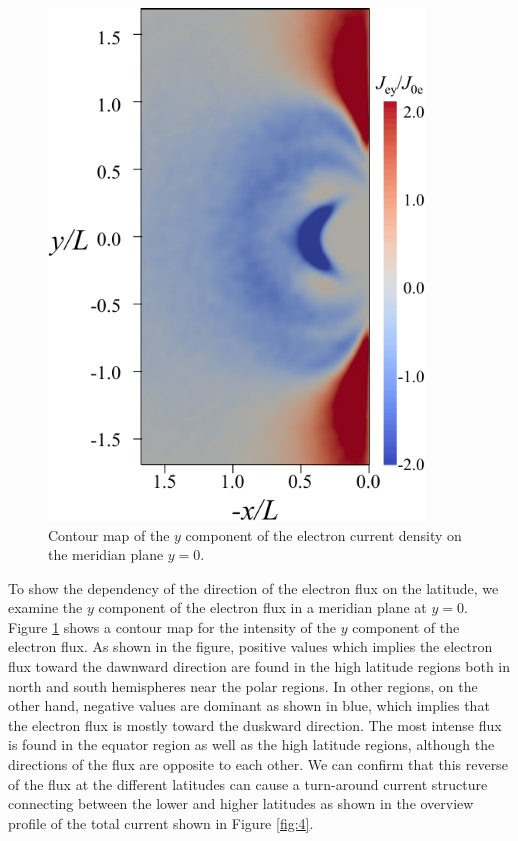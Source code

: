 \documentclass[draft,jgrga]{agutex2015}
\begin{document}
\begin{article}
\begin{figure}[h]
\centering
\noindent\includegraphics[width=10cm]{./figures/Fig_7_bb-crop.pdf}
\caption{Contour map of the $y$ component of the electron current density 
on the meridian plane $y=0$.}\label{fig:7} 
\end{figure}

To show the dependency of the direction of the electron flux on the latitude, 
we examine the $y$ component of the electron flux in a meridian plane at $y=0$.
Figure \ref{fig:7} shows a contour map for the intensity of 
the $y$ component of the electron flux.
As shown in the figure, 
positive values which implies the electron flux toward the dawnward direction
are found in the high latitude regions both in north and south hemispheres
near the polar regions.
In other regions, on the other hand, 
negative values are dominant as shown in blue, 
which implies that the electron flux is mostly toward the duskward direction. 
The most intense flux is found in the equator region as well as 
the high latitude regions, 
although the directions of the flux are opposite to each other.
We can confirm that this reverse of the flux at the different latitudes can 
cause a turn-around current structure connecting between the lower and higher latitudes 
as shown in the overview profile of the total current shown in Figure \ref{fig:4}.



\end{article}
\end{document}
